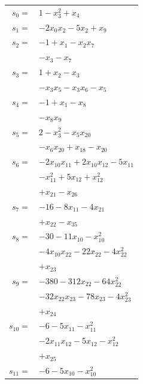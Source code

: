 \begingroup
\small
\setlength{\tabcolsep}{2pt}
\setlength{\LTleft}{0pt}
\begin{longtable}{@{}r@{\;}l@{}}
\(s_{0}=\) & \(\displaystyle 1 -x_{3}^{2} +x_{4}\) \\[3pt]
\(s_{1}=\) & \(\displaystyle -2x_{0}x_{2} -5x_{2} +x_{9}\) \\[3pt]
\(s_{2}=\) & \(\displaystyle -1 +x_{1} -x_{2}x_{7}\) \\
 & \(\displaystyle -x_{3} -x_{7}\) \\[3pt]
\(s_{3}=\) & \(\displaystyle 1 +x_{2} -x_{3}\) \\
 & \(\displaystyle -x_{3}x_{5} -x_{3}x_{6} -x_{5}\) \\[3pt]
\(s_{4}=\) & \(\displaystyle -1 +x_{1} -x_{8}\) \\
 & \(\displaystyle -x_{8}x_{9}\) \\[3pt]
\(s_{5}=\) & \(\displaystyle 2 -x_{3}^{2} -x_{5}x_{20}\) \\
 & \(\displaystyle -x_{6}x_{20} +x_{18} -x_{20}\) \\[3pt]
\(s_{6}=\) & \(\displaystyle -2x_{10}x_{11} +2x_{10}x_{12} -5x_{11}\) \\
 & \(\displaystyle -x_{11}^{2} +5x_{12} +x_{12}^{2}\) \\
 & \(\displaystyle +x_{21} -x_{26}\) \\[3pt]
\(s_{7}=\) & \(\displaystyle -16 -8x_{11} -4x_{21}\) \\
 & \(\displaystyle +x_{22} -x_{35}\) \\[3pt]
\(s_{8}=\) & \(\displaystyle -30 -11x_{10} -x_{10}^{2}\) \\
 & \(\displaystyle -4x_{10}x_{22} -22x_{22} -4x_{22}^{2}\) \\
 & \(\displaystyle +x_{23}\) \\[3pt]
\(s_{9}=\) & \(\displaystyle -380 -312x_{22} -64x_{22}^{2}\) \\
 & \(\displaystyle -32x_{22}x_{23} -78x_{23} -4x_{23}^{2}\) \\
 & \(\displaystyle +x_{24}\) \\[3pt]
\(s_{10}=\) & \(\displaystyle -6 -5x_{11} -x_{11}^{2}\) \\
 & \(\displaystyle -2x_{11}x_{12} -5x_{12} -x_{12}^{2}\) \\
 & \(\displaystyle +x_{25}\) \\[3pt]
\(s_{11}=\) & \(\displaystyle -6 -5x_{10} -x_{10}^{2}\) \\

\end{longtable}
